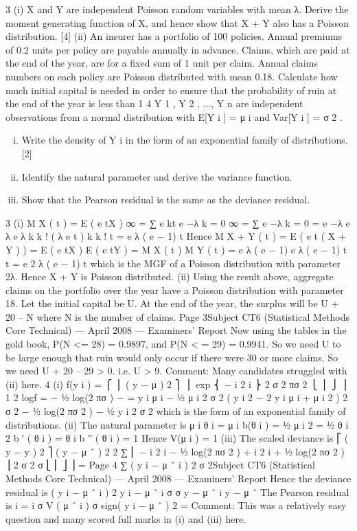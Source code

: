 
3
(i) X and Y are independent Poisson random variables with mean λ. Derive the
moment generating function of X, and hence show that X + Y also has a
Poisson distribution.
[4]
(ii) An insurer has a portfolio of 100 policies. Annual premiums of 0.2 units per
policy are payable annually in advance. Claims, which are paid at the end of
the year, are for a fixed sum of 1 unit per claim. Annual claims numbers on
each policy are Poisson distributed with mean 0.18.
Calculate how much initial capital is needed in order to ensure that the
probability of ruin at the end of the year is less than 1%
4
Y 1 , Y 2 , ..., Y n are independent observations from a normal distribution with E[Y i ] = μ i
and Var[Y i ] = σ 2 .
\begin{enumerate}[(i)]
\item  Write the density of Y i in the form of an exponential family of distributions. [2]
\item Identify the natural parameter and derive the variance function.
\item Show that the Pearson residual is the same as the deviance residual.
\end{enumerate}
3
(i)
M X ( t ) = E ( e tX )
∞
= ∑ e kt e −λ
k = 0
∞
= ∑ e −λ
k = 0
= e −λ e λ e
λ k
k !
( λ e t ) k
k !
t
= e λ ( e − 1)
t
Hence
M X + Y ( t ) = E ( e t ( X + Y ) )
= E ( e tX ) E ( e tY )
= M X ( t ) M Y ( t )
= e λ ( e − 1) e λ ( e − 1)
t
t
= e 2 λ ( e − 1)
t
which is the MGF of a Poisson distribution with parameter 2λ. Hence X + Y is
Poisson distributed.
(ii)
Using the result above, aggregate claims on the portfolio over the year have a
Poisson distribution with parameter 18.
Let the initial capital be U. At the end of the year, the surplus will be
U + 20 – N where N is the number of claims.
Page 3Subject CT6 (Statistical Methods Core Technical) — April 2008 — Examiners’ Report
Now using the tables in the gold book, P(N <= 28) = 0.9897, and
P(N < = 29) = 0.9941.
So we need U to be large enough that ruin would only occur if there were 30
or more claims. So we need U + 20 – 29 > 0.
i.e. U > 9.
Comment: Many candidates struggled with (ii) here.
4
(i)
f(y i ) =
⎧ ⎪ ( y − μ ) 2 ⎫ ⎪
exp ⎨ − i 2 i ⎬
2 σ
2 πσ 2
⎩ ⎪
⎭ ⎪
1
2
logf = − 1⁄2 log(2 πσ ) −
=
y i μ i − 1⁄2 μ i 2
σ 2
( y i 2 − 2 y i μ i + μ i 2 )
2 σ 2
− 1⁄2 log(2 πσ 2 ) − 1⁄2
y i 2
σ 2
which is the form of an exponential family of distributions.
(ii)
The natural parameter is μ i
θ i = μ i
b(θ i ) = 1⁄2 μ i 2 = 1⁄2 θ i 2
b ′ ( θ i ) = θ i
b ′′ ( θ i ) = 1
Hence V(μ i ) = 1
(iii)
The scaled deviance is
⎡ ( y − y ) 2
⎤
( y − μ ˆ ) 2
2 ∑ ⎢ − i 2 i − 1⁄2 log(2 πσ 2 ) + i 2 i + 1⁄2 log(2 πσ 2 ) ⎥
2 σ
2 σ
⎣ ⎢
⎦ ⎥
=
Page 4
∑
( y i − μ ˆ i ) 2
σ 2Subject CT6 (Statistical Methods Core Technical) — April 2008 — Examiners’ Report
Hence the deviance residual is
( y i − μ ˆ i ) 2
y i − μ ˆ i
σ
σ
y − μ ˆ i
y − μ ˆ
The Pearson residual is i
= i
σ V ( μ ˆ i )
σ
sign( y i − μ ˆ )
2
=
Comment: This was a relatively easy question and many scored full marks in (i) and
(iii) here.



